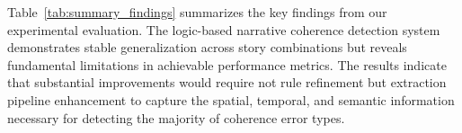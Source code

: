 Table~\ref{tab:summary_findings} summarizes the key findings from our experimental evaluation. The logic-based narrative coherence detection system demonstrates stable generalization across story combinations but reveals fundamental limitations in achievable performance metrics. The results indicate that substantial improvements would require not rule refinement but extraction pipeline enhancement to capture the spatial, temporal, and semantic information necessary for detecting the majority of coherence error types.
